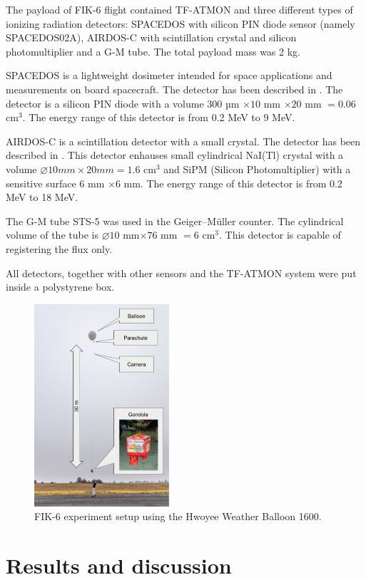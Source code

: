 \documentclass{Rpd}
\begin{document}
The payload of FIK-6 flight contained TF-ATMON and three different types of ionizing radiation detectors: SPACEDOS with silicon PIN diode sensor (namely SPACEDOS02A), AIRDOS-C with scintillation crystal and silicon photomultiplier and a G-M tube. The total payload mass was 2 kg.

SPACEDOS is a lightweight dosimeter intended for space applications and measurements on board spacecraft. The detector has been described in \cite{SPACEDOS}. The detector is a silicon PIN diode with a volume $300$ µm $\times 10$ mm $\times 20$ mm $= 0.06$ cm$^3$. The energy range of this detector is from 0.2 MeV to 9 MeV.

AIRDOS-C is a scintillation detector with a small crystal. The detector has been described in \cite{AIRDOS-C}. This detector enhauses small cylindrical NaI(Tl) crystal with a volume $\diameter 10 mm \times 20 mm = 1.6$ cm$^3$ and SiPM (Silicon Photomultiplier) with a sensitive surface $6$ mm $\times 6$ mm. The energy range of this detector is from 0.2 MeV to 18 MeV.

The G-M tube STS-5 was used in the Geiger–Müller counter. The cylindrical volume of the tube is $\diameter 10$ mm$ \times 76$ mm $= 6$ cm$^3$. This detector is capable of registering the flux only. 

All detectors, together with other sensors and the TF-ATMON system were put inside a polystyrene box. 

\begin{figure}%
	\centerline{\includegraphics[width=50mm]{img/FIK-6_experiment_setup.png}}
	\caption{FIK-6 experiment setup using the Hwoyee Weather Balloon 1600. \label{FIK-6_setup}}
\end{figure}


\section{Results and discussion}
\end{document}
